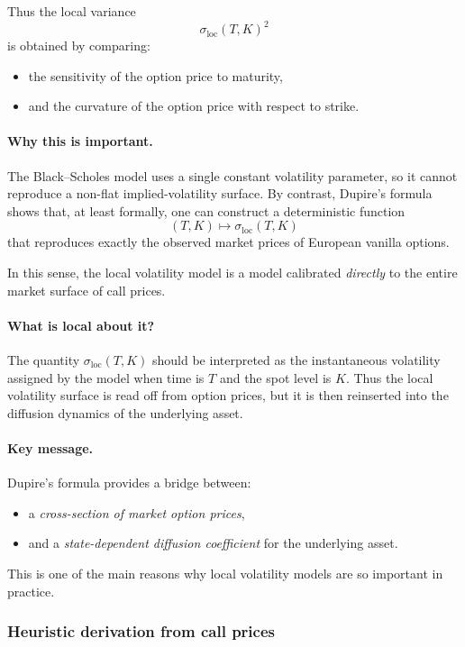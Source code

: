 \documentclass[11pt]{article}
\theoremstyle{plain}
\theoremstyle{definition}
\theoremstyle{remark}
\begin{document}
Thus the local variance
\[
\sigma_{\mathrm{loc}}(T,K)^2
\]
is obtained by comparing:
\begin{itemize}[leftmargin=1.4em]
    \item the sensitivity of the option price to maturity,
    \item and the curvature of the option price with respect to strike.
\end{itemize}

\paragraph{Why this is important.}
The Black--Scholes model uses a single constant volatility parameter, so
it cannot reproduce a non-flat implied-volatility surface.
By contrast, Dupire's formula shows that, at least formally, one can
construct a deterministic function
\[
(T,K)\longmapsto \sigma_{\mathrm{loc}}(T,K)
\]
that reproduces exactly the observed market prices of European vanilla
options.

In this sense, the local volatility model is a model calibrated
\emph{directly} to the entire market surface of call prices.

\paragraph{What is local about it?}
The quantity \(\sigma_{\mathrm{loc}}(T,K)\) should be interpreted as the
instantaneous volatility assigned by the model when time is \(T\) and
the spot level is \(K\).
Thus the local volatility surface is read off from option prices, but it
is then reinserted into the diffusion dynamics of the underlying asset.

\paragraph{Key message.}
Dupire's formula provides a bridge between:
\begin{itemize}[leftmargin=1.4em]
    \item a \emph{cross-section of market option prices},
    \item and a \emph{state-dependent diffusion coefficient} for the
    underlying asset.
\end{itemize}

This is one of the main reasons why local volatility models are so
important in practice.

\subsubsection{Heuristic derivation from call prices}
\end{document}
